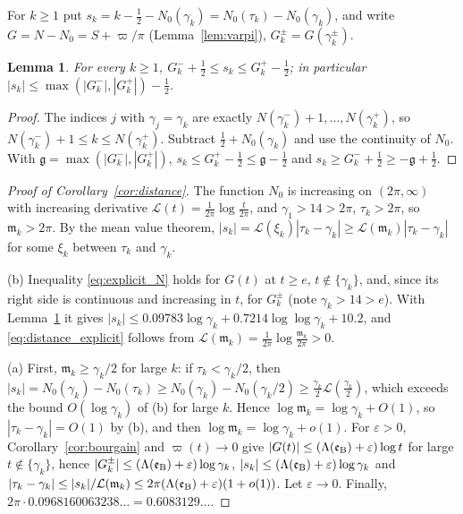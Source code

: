 \documentclass[11pt,a4paper]{article}
\makeatletter
\numberwithin{equation}{section}
\DeclareRobustCommand{\CGref}[1]{\ref{#1}}
\DeclareRobustCommand{\CGeqref}[1]{\eqref{#1}}
\let\CG@origref\ref
\let\CG@origeqref\eqref
\newcommand{\CG@gettip}[1]{\@ifundefined{CGTip@#1}{#1}{\csname CGTip@#1\endcsname}}
\DeclareRobustCommand{\CGref}[1]{\pdftooltip{\CG@origref{#1}}{\CG@gettip{#1}}}
\DeclareRobustCommand{\CGeqref}[1]{\pdftooltip{\CG@origeqref{#1}}{\CG@gettip{#1}}}
\newtheorem{lemma}[theorem]{Lemma}
\theoremstyle{definition}
\theoremstyle{remark}
\newcommand{\Nz}{N_0} %
\newcommand{\lL}{\mathcal L}
\newcommand{\eB}{\mathfrak e_{\rm B}}
\makeatother
\begin{document}
For $k\ge1$ put $s_k=k-\frac12-\Nz(\gamma_k)=\Nz(\tau_k)-\Nz(\gamma_k)$, and write $G=N-\Nz=S+\varpi/\pi$ (Lemma~\CGref{lem:varpi}), $G_k^\pm=G(\gamma_k^\pm)$.

\begin{lemma}\label{lem:s_bounds}
For every $k\ge1$, $G_k^-+\frac12\le s_k\le G_k^+-\frac12$; in particular $|s_k|\le\max(|G_k^-|,|G_k^+|)-\frac12$.
\end{lemma}

\begin{proof}
The indices $j$ with $\gamma_j=\gamma_k$ are exactly $N(\gamma_k^-)+1,\dots,N(\gamma_k^+)$, so $N(\gamma_k^-)+1\le k\le N(\gamma_k^+)$. Subtract $\frac12+\Nz(\gamma_k)$ and use the continuity of $\Nz$. With $\mathfrak g=\max(|G_k^-|,|G_k^+|)$, $s_k\le G_k^+-\frac12\le\mathfrak g-\frac12$ and $s_k\ge G_k^-+\frac12\ge-\mathfrak g+\frac12$.
\end{proof}

\begin{proof}[Proof of Corollary~\ref{cor:distance}]
The function $\Nz$ is increasing on $(2\pi,\infty)$ with increasing derivative $\lL(t)=\frac1{2\pi}\log\frac t{2\pi}$, and $\gamma_1>14>2\pi$, $\tau_k>2\pi$, so $\mathfrak m_k>2\pi$. By the mean value theorem, $|s_k|=\lL(\xi_k)|\tau_k-\gamma_k|\ge\lL(\mathfrak m_k)|\tau_k-\gamma_k|$ for some $\xi_k$ between $\tau_k$ and $\gamma_k$.

(b) Inequality \CGeqref{eq:explicit_N} holds for $G(t)$ at $t\ge e$, $t\notin\{\gamma_k\}$, and, since its right side is continuous and increasing in $t$, for $G_k^\pm$ (note $\gamma_k>14>e$). With Lemma~\CGref{lem:s_bounds} it gives $|s_k|\le0.09783\log\gamma_k+0.7214\log\log\gamma_k+10.2$, and \CGeqref{eq:distance_explicit} follows from $\lL(\mathfrak m_k)=\frac1{2\pi}\log\frac{\mathfrak m_k}{2\pi}>0$.

(a) First, $\mathfrak m_k\ge\gamma_k/2$ for large $k$: if $\tau_k<\gamma_k/2$, then $|s_k|=\Nz(\gamma_k)-\Nz(\tau_k)\ge\Nz(\gamma_k)-\Nz(\gamma_k/2)\ge\frac{\gamma_k}2\lL(\frac{\gamma_k}2)$, which exceeds the bound $O(\log\gamma_k)$ of (b) for large $k$. Hence $\log\mathfrak m_k=\log\gamma_k+O(1)$, so $|\tau_k-\gamma_k|=O(1)$ by (b), and then $\log\mathfrak m_k=\log\gamma_k+o(1)$. For $\varepsilon>0$, Corollary~\CGref{cor:bourgain} and $\varpi(t)\to0$ give $|G(t)|\le(\Lambda(\eB)+\varepsilon)\log t$ for large $t\notin\{\gamma_k\}$, hence $|G_k^\pm|\le(\Lambda(\eB)+\varepsilon)\log\gamma_k$, $|s_k|\le(\Lambda(\eB)+\varepsilon)\log\gamma_k$ and $|\tau_k-\gamma_k|\le|s_k|/\lL(\mathfrak m_k)\le2\pi(\Lambda(\eB)+\varepsilon)(1+o(1))$. Let $\varepsilon\to0$. Finally, $2\pi\cdot0.0968160063238\ldots=0.6083129\ldots$.
\end{proof}
\end{document}
